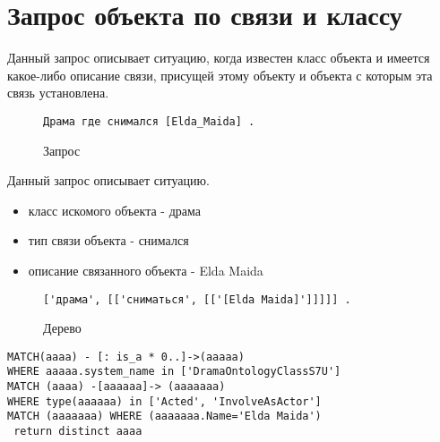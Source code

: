 \section{Запрос объекта по связи и классу}
Данный запрос описывает ситуацию, когда известен класс объекта и имеется какое-либо описание связи, присущей этому объекту и объекта с которым эта связь установлена.
\begin{figure}[!h]
\begin{tcolorbox}[colback=white, sharpish corners]
\begin{verbatim}
Драма где снимался [Elda_Maida] .
\end{verbatim}
\end{tcolorbox}
\caption{Запрос}
\end{figure}
Данный запрос описывает ситуацию. 
\begin{itemize}
\item класс искомого объекта - драма
\item тип связи объекта - снимался 
\item описание связанного объекта - Elda Maida
\end{itemize}
\begin{figure}[!h]
\begin{tcolorbox}[colback=white, sharpish corners]
\begin{verbatim}
['драма', [['сниматься', [['[Elda Maida]']]]]] .
\end{verbatim}
\end{tcolorbox}
\caption{Дерево}
\end{figure}
\begin{lstlisting}[caption={Результат}]
MATCH(aaaa) - [: is_a * 0..]->(aaaaa)
WHERE aaaaa.system_name in ['DramaOntologyClassS7U']
MATCH (aaaa) -[aaaaaa]-> (aaaaaaa) 
WHERE type(aaaaaa) in ['Acted', 'InvolveAsActor']
MATCH (aaaaaaa) WHERE (aaaaaaa.Name='Elda Maida')
 return distinct aaaa
\end{lstlisting}

